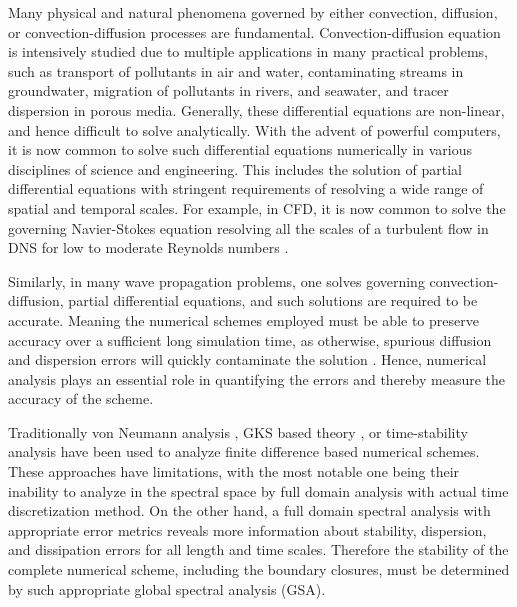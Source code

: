 \documentclass[showpacs,preprintnumbers,amsmath,amssymb]{revtex4-1} %
\begin{document}
Many physical and natural phenomena governed by either convection, diffusion, or convection-diffusion processes are fundamental. Convection-diffusion equation is intensively studied due to multiple applications in many practical problems, such as transport of pollutants in air and water, contaminating streams in groundwater, migration of pollutants in rivers, and seawater, and tracer dispersion in porous media. Generally, these differential equations are non-linear, and hence difficult to solve analytically. With the advent of powerful computers, it is now common to solve such differential equations numerically in various disciplines of science and engineering. This includes the solution of partial differential equations with stringent requirements of resolving a wide range of spatial and temporal scales. For example, in CFD, it is now common to solve the governing Navier-Stokes equation resolving all the scales of a turbulent flow in DNS for low to moderate Reynolds numbers \cite{orszag_1970, Sengupta_et_al_8, SENGUPTA_et_al_9}.

Similarly, in many wave propagation problems, one solves governing convection-diffusion, partial differential equations, and such solutions are required to be accurate. Meaning the numerical schemes employed must be able to preserve accuracy over a sufficient long simulation time, as otherwise, spurious diffusion and dispersion errors will quickly contaminate the solution \cite{sengupta2013high}. Hence, numerical analysis plays an essential role in quantifying the errors and thereby measure the accuracy of the scheme.

Traditionally von Neumann analysis \citep{NEUMANN_at_al, Trefethen_et_al, Strikwerda}, GKS based theory \cite{Gustafsson_et_al}, or time-stability analysis \cite{CARPENTER_et_al, ZHONG} have been used to analyze finite difference based numerical schemes. These approaches have limitations, with the most notable one being their inability to analyze in the spectral space by full domain analysis with actual time discretization method. On the other hand, a full domain spectral analysis with appropriate error metrics \cite{SENGUPTA_et_al_2, SENGUPTA_et_al_3} reveals more information about stability, dispersion, and dissipation errors for all length and time scales. Therefore the stability of the complete numerical scheme, including the boundary closures, must be determined by such appropriate global spectral analysis (GSA).
\end{document}

